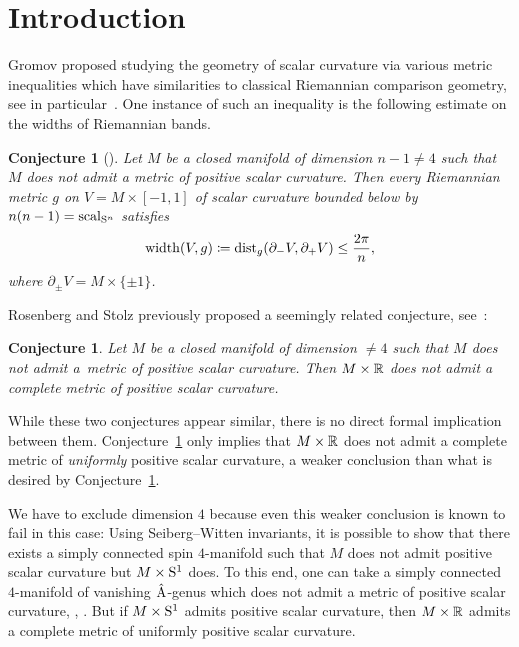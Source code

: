 \documentclass[pdftex]{sigma}
\numberwithin{equation}{section}
\newtheorem{Conjecture}[Theorem]{Conjecture}
 { \theoremstyle{definition}
\newtheorem{Definition}[Theorem]{Definition}
\newtheorem{Note}[Theorem]{Note}
\newtheorem{Example}[Theorem]{Example}
\newtheorem{Remark}[Theorem]{Remark} }
\begin{document}
\section{Introduction}
Gromov proposed studying the geometry of scalar curvature via various metric inequalities which have similarities to classical Riemannian comparison geometry, see in particular~\cite{Gromov:MetricInequalitiesScalar,gromovFourLecturesScalar2019}.
One instance of such an inequality is the following estimate on the widths of Riemannian bands.
\begin{Conjecture}[{\cite[Section~11.12, Conjecture~C]{Gromov:MetricInequalitiesScalar}}]\label{conj:band-width}
 Let \(M\) be a closed manifold of dimension \(n-1\neq 4\) such that \(M\) does not admit a metric of positive scalar curvature.
 Then every Riemannian metric \(g\) on \(V = M \times [-1,1]\) of scalar curvature bounded below by \(n(n-1) = \operatorname{scal}_{\mathrm{S}^n}\) satisfies
 \[
 \operatorname{width}(V, g) \coloneqq \operatorname{dist}_g(\partial_- V, \partial_+ V) \leq \frac{2\pi}{n},
 \]
 where \(\partial_\pm V = M \times \{\pm 1\}\).
\end{Conjecture}

Rosenberg and Stolz previously proposed a seemingly related conjecture, see~\cite[Section~7]{Rosenberg-Stolz:Manifolds-of-psc}:

\begin{Conjecture}\label{conj:no-complete-psc}
 Let \(M\) be a closed manifold of dimension \(\neq 4\) such that \(M\) does not admit a~metric of positive scalar curvature.
 Then \(M \times \mathbb{R}\) does not admit a complete metric of positive scalar curvature.
\end{Conjecture}

While these two conjectures appear similar, there is no direct formal implication between them.
Conjecture~\ref{conj:band-width} only implies that \(M \times \mathbb{R}\) does not admit a complete metric of \emph{uniformly} positive scalar curvature, a weaker conclusion than what is desired by Conjecture~\ref{conj:no-complete-psc}.
\begin{Remark}
We have to exclude dimension \(4\) because even this weaker conclusion is known to fail in this case: Using Seiberg--Witten invariants, it is possible to show that there exists a simply connected spin \(4\)-manifold such that \(M\) does not admit positive scalar curvature but \(M \times \mathrm{S}^1\) does.
To this end, one can take a simply connected \(4\)-manifold of vanishing \(\hat{\mathrm{A}}\)-genus which does not admit a metric of positive scalar curvature, \cite[Counterexample~4.16]{RosenbergStolz:PSCSurgeryConnections}, \cite{Taubes:SeibergWitten}.
But if \(M \times \mathrm{S}^1\) admits positive scalar curvature, then \(M \times \mathbb{R}\) admits a complete metric of uniformly positive scalar curvature.
\end{Remark}
\end{document}

